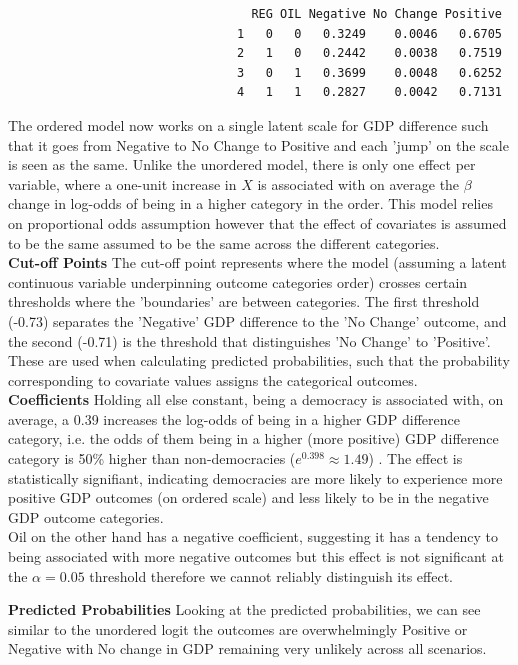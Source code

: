\documentclass[12pt,letterpaper]{article}
\begin{document}
\begin{enumerate}
		\begin{verbatim}
								  REG OIL Negative No Change Positive
								1   0   0   0.3249    0.0046   0.6705
								2   1   0   0.2442    0.0038   0.7519
								3   0   1   0.3699    0.0048   0.6252
								4   1   1   0.2827    0.0042   0.7131
		\end{verbatim}
			
		The ordered model now works on a single latent scale for GDP difference such that it goes from Negative to No Change to Positive and each 'jump' on the scale is seen as the same. Unlike the unordered model, there is only one effect per variable, where a one-unit increase in $X$ is associated with on average the $\beta$ change in log-odds of being in a higher category in the order. This model relies on proportional odds assumption however that the effect of covariates is assumed to be the same assumed to be the same across the different categories.  \\
		
		\textbf{Cut-off Points}
		The cut-off point represents where the model (assuming a latent continuous variable underpinning outcome categories order) crosses certain thresholds where the 'boundaries' are between categories. The first threshold (-0.73) separates the 'Negative' GDP difference to the 'No Change' outcome, and the second (-0.71) is the threshold that distinguishes 'No Change' to 'Positive'. These are used when calculating predicted probabilities, such that the probability corresponding to covariate values assigns the categorical outcomes. \\
		
		\textbf{Coefficients}
		Holding all else constant, being a democracy is associated with, on average, a 0.39 increases the log-odds of being in a higher GDP difference category, i.e. the odds of them being in a higher (more positive) GDP difference category is 50\% higher than non-democracies ($e^{0.398} \approx1.49$) . The effect is statistically signifiant, indicating democracies are more likely to experience more positive GDP outcomes (on ordered scale) and less likely to be in the negative GDP outcome categories. \\
		
		Oil on the other hand has a negative coefficient, suggesting it has a tendency to being associated with more negative outcomes but this effect is not significant at the $\alpha =0.05$ threshold therefore we cannot reliably distinguish its effect. 
		
		\textbf{Predicted Probabilities}
		Looking at the predicted probabilities, we can see similar to the unordered logit the outcomes are overwhelmingly Positive or Negative with No change in GDP remaining very unlikely across all scenarios. 
		

\end{enumerate}
\end{document}
